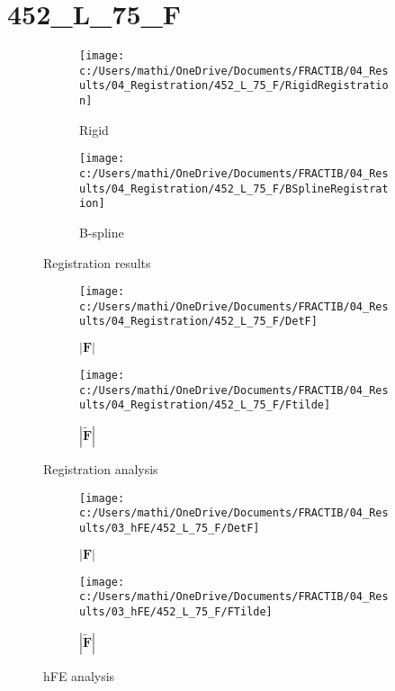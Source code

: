 \documentclass{article}%
\begin{document}
%
\newpage%
\section*{452\_L\_75\_F}%
\label{sec:452L75F}%


\begin{figure}[h!]%
\begin{subfigure}[b]{0.5\linewidth}%
\texttt{[image: c:/Users/mathi/OneDrive/Documents/FRACTIB/04\_Results/04\_Registration/452\_L\_75\_F/RigidRegistration]}%
\caption{Rigid}%
\end{subfigure}%
\begin{subfigure}[b]{0.5\linewidth}%
\texttt{[image: c:/Users/mathi/OneDrive/Documents/FRACTIB/04\_Results/04\_Registration/452\_L\_75\_F/BSplineRegistration]}%
\caption{B{-}spline}%
\end{subfigure}%
\caption{Registration results}%
\end{figure}

%


\begin{figure}[h!]%
\begin{subfigure}[b]{0.5\linewidth}%
\texttt{[image: c:/Users/mathi/OneDrive/Documents/FRACTIB/04\_Results/04\_Registration/452\_L\_75\_F/DetF]}%
\caption{$|\mathbf{F}|$}%
\end{subfigure}%
\begin{subfigure}[b]{0.5\linewidth}%
\texttt{[image: c:/Users/mathi/OneDrive/Documents/FRACTIB/04\_Results/04\_Registration/452\_L\_75\_F/Ftilde]}%
\caption{$|\widetilde{\mathbf{F}}|$}%
\end{subfigure}%
\caption{Registration analysis}%
\end{figure}

%


\begin{figure}[h!]%
\begin{subfigure}[b]{0.5\linewidth}%
\texttt{[image: c:/Users/mathi/OneDrive/Documents/FRACTIB/04\_Results/03\_hFE/452\_L\_75\_F/DetF]}%
\caption{$|\mathbf{F}|$}%
\end{subfigure}%
\begin{subfigure}[b]{0.5\linewidth}%
\texttt{[image: c:/Users/mathi/OneDrive/Documents/FRACTIB/04\_Results/03\_hFE/452\_L\_75\_F/FTilde]}%
\caption{$|\widetilde{\mathbf{F}}|$}%
\end{subfigure}%
\caption{hFE analysis}%
\end{figure}
\end{document}
